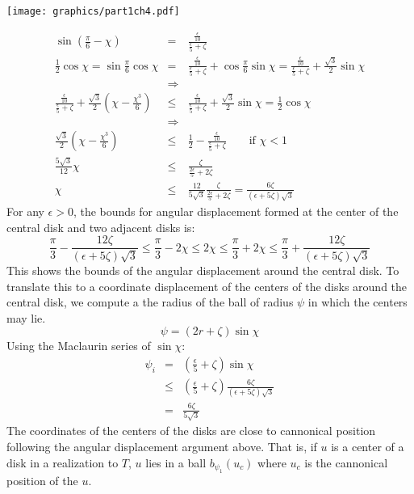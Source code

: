 \documentclass[10pt]{CSUNthesis}
\theoremstyle{plain}%
\theoremstyle{definition}
\theoremstyle{remark}
\newcommand{\lr}[1]{\left( #1 \right)}
\begin{document}
\begin{minipage}{\linewidth}
\begin{center}
\texttt{[image: graphics/part1ch4.pdf]}
\label{fig:part1ch4.pdf}
\end{center}
\end{minipage}

\begin{eqnarray*}
\sin \lr{\frac{\pi}{6} - \chi} &=& \frac{\frac{\epsilon}{10}}{\frac{\epsilon}{5}+\zeta}\\
\frac{1}{2}\cos \chi = \sin \frac{\pi}{6} \cos \chi &=& \frac{\frac{\epsilon}{10}}{\frac{\epsilon}{5}+\zeta} + \cos \frac{\pi}{6} \sin \chi = \frac{\frac{\epsilon}{10}}{\frac{\epsilon}{5}+\zeta} +\frac{\sqrt{3}}{2} \sin \chi \\
&\Rightarrow&\\
\frac{\frac{\epsilon}{10}}{\frac{\epsilon}{5}+\zeta}+ \frac{\sqrt{3}}{2} \lr{ \chi - \frac{\chi^3}{6}} &\leq& \frac{\frac{\epsilon}{10}}{\frac{\epsilon}{5}+\zeta} + \frac{\sqrt{3}}{2} \sin \chi =\frac{1}{2} \cos \chi\\
&\Rightarrow&\\
\frac{\sqrt{3}}{2} \lr{ \chi - \frac{\chi^3}{6}}&\leq& \frac{1}{2}-\frac{\frac{\epsilon}{10}}{\frac{\epsilon}{5}+\zeta}  \qquad \text{if }\chi < 1 \\
\frac{5\sqrt{3}}{12} \chi &\leq& \frac{  \zeta }{ \frac{2\epsilon}{5} + 2\zeta } \\
\chi&\leq& \frac{12}{5\sqrt{3}}\frac{  \zeta }{ \frac{2\epsilon}{5} + 2\zeta } = \frac{6 \zeta}{\lr{\epsilon + 5 \zeta}\sqrt{3}}
\end{eqnarray*}
For any $\epsilon > 0$, the bounds for angular displacement formed at the center of the central disk and two adjacent disks is:
$$ \frac{\pi}{3} - \frac{12 \zeta}{\lr{\epsilon + 5 \zeta}\sqrt{3}}\leq \frac{\pi}{3} - 2 \chi  \leq 2\chi \leq \frac{\pi}{3} + 2 \chi \leq \frac{\pi}{3} + \frac{12 \zeta}{\lr{\epsilon + 5 \zeta}\sqrt{3}}$$
This shows the bounds of the angular displacement around the central disk.  
To translate this to a coordinate displacement of the centers of the disks around the central disk, we compute a the radius of the ball of radius $\psi$ in which the centers may lie. 
$$\psi = \lr{2 r + \zeta} \sin \chi$$
Using the Maclaurin series of $\sin \chi$:
$$
\begin{array}{rcl}
\psi_i &=& \lr{ \frac{\epsilon}{5} + \zeta} \sin \chi\\
&\leq& \lr{ \frac{\epsilon}{5} + \zeta} \frac{6 \zeta}{\lr{\epsilon + 5 \zeta}\sqrt{3}}\\
&=& \frac{6\zeta}{5 \sqrt{3}}
\end{array}
$$
The coordinates of the centers of the disks are close to cannonical position following the angular displacement argument above.  
That is, if $u$ is a center of a disk in a realization to $T$, $u$ lies in a ball $b_{\psi_1}\lr{u_c}$ where $u_c$ is the cannonical position of the $u$.  
\end{document}
